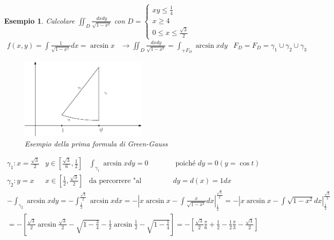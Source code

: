 \documentclass{book}
\newtheorem{esempio}{Esempio}
\begin{document}
\begin{esempio}
	Calcolare $\iint_D\frac{dxdy}{\sqrt{1-x^2}}$ con $D=\begin{cases}
		xy\leq \frac{1}{4}\\
		x\geq 4\\
		0\leq x\leq \frac{\sqrt{3}}{2}
	\end{cases}$
	\begin{equation*}
		\begin{matrix}
			f(x,y)=\int\frac{1}{\sqrt{1-x^2}}dx=\arcsin x & \to \iint_D
			\frac{dxdy}{\sqrt{1-x^2}}=\int_{+F_D}\arcsin x dy & F_D=
			F_D=\gamma_1\cup \gamma_2 \cup \gamma_3
		\end{matrix}
	\end{equation*}
	\begin{figure}[ht]
		\centering
		\includegraphics[width=6cm]{img/finiti/greenes.eps}
		\caption{Esempio della prima formula di Green-Gauss}
	\end{figure}
	\begin{equation*}
		\begin{matrix}
			\gamma_1: x=\frac{\sqrt{3}}{2} &
			y\in\left[\frac{\sqrt{3}}{6},\frac{1}{2}\right] & \int_{\gamma_1}\arcsin x dy=0
			& \text{ poiché } dy=0 (y=\cos t)\\
			\gamma_2: y=x & x\in \left[\frac{1}{2}, \frac{\sqrt{3}}{2}\right] &
			\text{da percorrere "al contrario"} & dy=d(x)=1dx
		\end{matrix}
	\end{equation*}
\begin{equation*}
	\begin{matrix}
		-\int_{\gamma_2} \arcsin x dy=-\int_{\frac{1}{2}}^{\frac{\sqrt{3}}{2}}
		\arcsin x dx = -\left| x\arcsin x - \int
		\frac{x}{\sqrt{1-x^2}}dx\right|_{\frac{1}{2}}^{\frac{\sqrt{3}}{2}}= 
		-\left| x\arcsin x - \int
		\sqrt{1-x^2}dx\right|_{\frac{1}{2}}^{\frac{\sqrt{3}}{2}}\\
		= -
		\left[\frac{\sqrt{3}}{2}\arcsin\frac{\sqrt{3}}{2}-\sqrt{1-\frac{3}{4}}
		- \frac{1}{2}\arcsin \frac{1}{2}-\sqrt{1-\frac{1}{4}} \right] =
		-\left[\frac{\sqrt{3}}{2}\frac{\pi}{6}+\frac{1}{2}-\frac{1}{2}
		\frac{\pi}{3} - \frac{\sqrt{3}}{2}\right]\\

\end{matrix}
\end{equation*}
\end{esempio}
\end{document}
